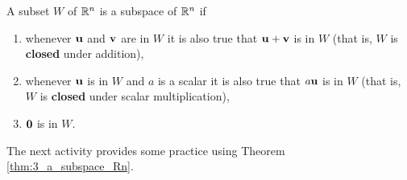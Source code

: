 \begin{theorem} \label{thm:3_a_subspace_Rn} A subset $W$ of $\mathbb{R}^n$ is a subspace of $\mathbb{R}^n$ if
\begin{enumerate}
\item whenever $\mathbf{u}$ and $\mathbf{v}$ are in $W$ it is also true that $\mathbf{u} + \mathbf{v}$ is in $W$ (that is, $W$ is \textbf{closed} under addition),
\item whenever $\mathbf{u}$ is in $W$ and $a$ is a scalar it is also true that $a\mathbf{u}$ is in $W$ (that is, $W$ is \textbf{closed} under scalar multiplication),
\item $\mathbf{0}$ is in $W$.
\end{enumerate}
\end{theorem}

The next activity provides some practice using Theorem \ref{thm:3_a_subspace_Rn}.

